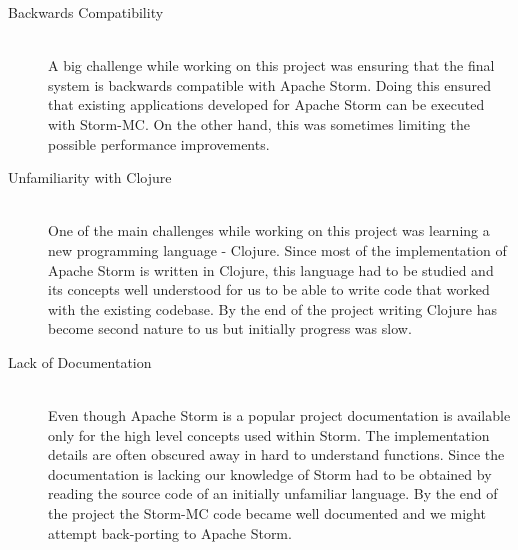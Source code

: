 \begin{description}
	\item[Backwards Compatibility] \hfill \\
	A big challenge while working on this project was ensuring that the final system is backwards compatible with Apache Storm. Doing this ensured that existing applications developed for Apache Storm can be executed with Storm-MC. On the other hand, this was sometimes limiting the possible performance improvements.
	\item[Unfamiliarity with Clojure] \hfill \\
	One of the main challenges while working on this project was learning a new programming language - Clojure. Since most of the implementation of Apache Storm is written in Clojure, this language had to be studied and its concepts well understood for us to be able to write code that worked with the existing codebase. By the end of the project writing Clojure has become second nature to us but initially progress was slow.
	\item[Lack of Documentation] \hfill \\
	Even though Apache Storm is a popular project documentation is available only for the high level concepts used within Storm. The implementation details are often obscured away in hard to understand functions. Since the documentation is lacking our knowledge of Storm had to be obtained by reading the source code of an initially unfamiliar language. By the end of the project the Storm-MC code became well documented and we might attempt back-porting to Apache Storm.
\end{description}

